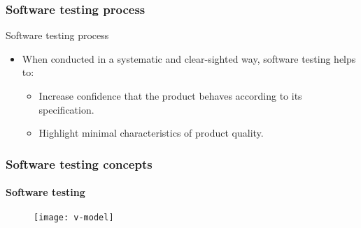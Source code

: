 \begin{frame}[parent={cmap:software-testing},hasnext=true,hasprev=true]
\label{concept:softwar-testing:process}
\frametitle{Software testing process}

\begin{block:fact}{Software testing process}
\begin{itemize}
	\item When conducted in a systematic and clear-sighted way, software
	testing helps to:
	\begin{itemize}
		\item Increase confidence that the product behaves according to its
		specification.

		\item Highlight minimal characteristics of product quality.
	\end{itemize}
\end{itemize}
\end{block:fact}

\begin{block:fact}{}
\end{block:fact}
\end{frame}


\begin{frame}[parent={cmap:software-testing},hasnext=false,hasprev=true]
\frametitle{Software testing concepts}
\framesubtitle{Software testing}

\begin{figure}
	\centering
	\texttt{[image: v-model]}
\end{figure}
\end{frame}
